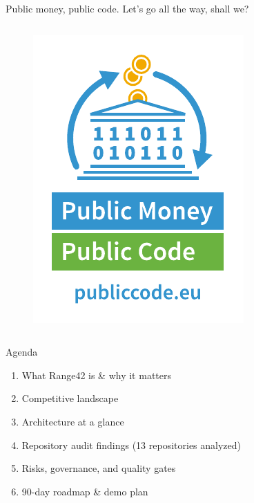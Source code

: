 \documentclass[aspectratio=169]{beamer}
\begin{document}
\begin{frame}{Public money, public code. Let's go all the way, shall we?}
\begin{columns}[T]
    \vspace{10mm}
    \begin{figure}
      \centering
      \includegraphics[width=\textwidth]{images/logos/FSFE_Public_Money_Public_Code_logo.pdf}
    \end{figure}
  \end{columns}
\end{frame}

\begin{frame}{Agenda}
  \begin{enumerate}
    \item What Range42 is \& why it matters
    \item Competitive landscape
    \item Architecture at a glance
    \item Repository audit findings (13 repositories analyzed)
    \item Risks, governance, and quality gates
    \item 90-day roadmap \& demo plan
  \end{enumerate}
\end{frame}
\end{document}
